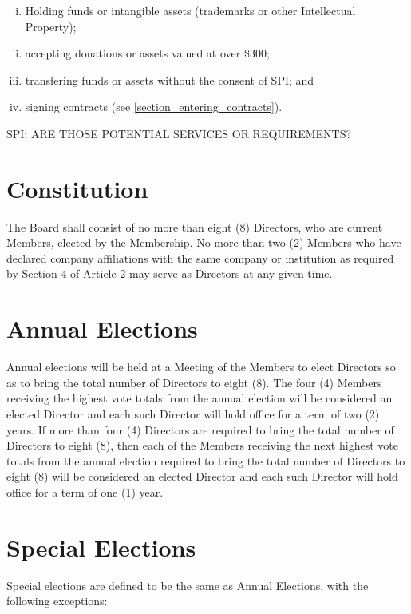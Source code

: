 \documentclass[10pt, english]{bylaws}
\begin{document}
\begin{enumerate}[(i)\hspace{.2cm}]
	\item Holding funds or intangible assets (trademarks or other
Intellectual Property);

	\item accepting donations or assets valued at over \$300;

	\item transfering funds or assets without the consent of SPI; and

	\item signing contracts (see \ref{section_entering_contracts}).
\end{enumerate}

SPI: ARE THOSE POTENTIAL SERVICES OR REQUIREMENTS?

\section{Constitution}
The Board shall consist of no more than eight (8) Directors, who are current
Members, elected by the Membership.  No more than two (2) Members who have
declared company affiliations with the same company or institution as required
by Section 4 of Article 2 may serve as Directors at any given time.

\section{Annual Elections}
Annual elections will be held at a Meeting of the Members to elect Directors so
as to bring the total number of Directors to eight (8).  The four (4) Members
receiving the highest vote totals from the annual election will be considered an
elected Director and each such Director will hold office for a term of two (2)
years.  If more than four (4) Directors are required to bring
the total number of Directors to eight (8), then each of the Members receiving
the next highest vote totals from the annual election required to bring the
total number of Directors to eight (8) will be considered an elected Director
and each such Director will hold office for a term of one (1) year.

\section{Special Elections}
Special elections are defined to be the same as Annual Elections, with the
following exceptions:
\end{document}
